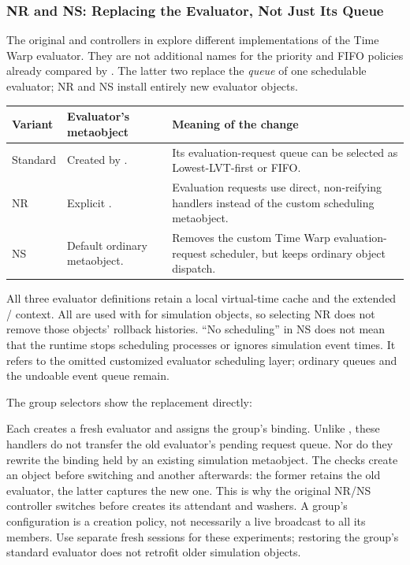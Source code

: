 \subsubsection{NR and NS: Replacing the Evaluator, Not Just Its Queue}
\label{sec:tw-variants}

The original  and  controllers in
 explore different implementations of the
Time Warp evaluator. They are not additional names for the priority
and FIFO policies already compared by .
The latter two replace the \emph{queue} of one schedulable evaluator;
NR and NS install entirely new evaluator objects.

\begin{longtable}{L{0.15\textwidth}L{0.36\textwidth}L{0.39\textwidth}}
\textbf{Variant} & \textbf{Evaluator's metaobject} & \textbf{Meaning of the change}\\\hline
\endhead
Standard & Created by . & Its evaluation-request
queue can be selected as Lowest-LVT-first or FIFO.\\
NR & Explicit . & Evaluation requests use direct,
non-reifying handlers instead of the custom scheduling metaobject.\\
NS & Default ordinary metaobject. & Removes the custom Time Warp
evaluation-request scheduler, but keeps ordinary object dispatch.\\
\end{longtable}

All three evaluator definitions retain a local virtual-time cache and
the extended / context. All are used with
 for simulation objects, so selecting NR does not
remove those objects' rollback histories. ``No scheduling'' in NS
does not mean that the runtime stops scheduling processes or ignores
simulation event times. It refers to the omitted customized evaluator
scheduling layer; ordinary queues and the undoable event queue remain.

The group selectors show the replacement directly:


Each creates a fresh evaluator and assigns the group's 
binding. Unlike , these handlers do not transfer
the old evaluator's pending request queue. Nor do they rewrite the
 binding held by an existing simulation metaobject.
The checks create an object before switching and another afterwards:
the former retains the old evaluator, the latter captures the new one.
This is why the original NR/NS controller switches before
 creates its attendant and washers. A group's configuration
is a creation policy, not necessarily a live broadcast to all its members.
Use separate fresh sessions for these experiments; restoring the group's
standard evaluator does not retrofit older simulation objects.

